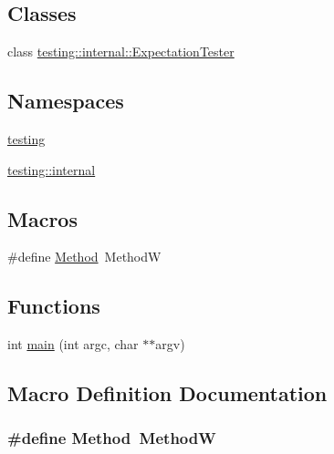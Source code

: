 \subsection*{Classes}
\begin{DoxyCompactItemize}
\item 
class \hyperlink{classtesting_1_1internal_1_1ExpectationTester}{testing\+::internal\+::\+Expectation\+Tester}
\end{DoxyCompactItemize}
\subsection*{Namespaces}
\begin{DoxyCompactItemize}
\item 
 \hyperlink{namespacetesting}{testing}
\item 
 \hyperlink{namespacetesting_1_1internal}{testing\+::internal}
\end{DoxyCompactItemize}
\subsection*{Macros}
\begin{DoxyCompactItemize}
\item 
\#define \hyperlink{gmock-spec-builders__test_8cc_a95606368148f3e5aab5db46c32466afd}{Method}~MethodW
\end{DoxyCompactItemize}
\subsection*{Functions}
\begin{DoxyCompactItemize}
\item 
int \hyperlink{gmock-spec-builders__test_8cc_a3c04138a5bfe5d72780bb7e82a18e627}{main} (int argc, char $\ast$$\ast$argv)
\end{DoxyCompactItemize}


\subsection{Macro Definition Documentation}
\subsubsection[{\texorpdfstring{Method}{Method}}]{\setlength{\rightskip}{0pt plus 5cm}\#define Method~MethodW}\hypertarget{gmock-spec-builders__test_8cc_a95606368148f3e5aab5db46c32466afd}{}\label{gmock-spec-builders__test_8cc_a95606368148f3e5aab5db46c32466afd}



